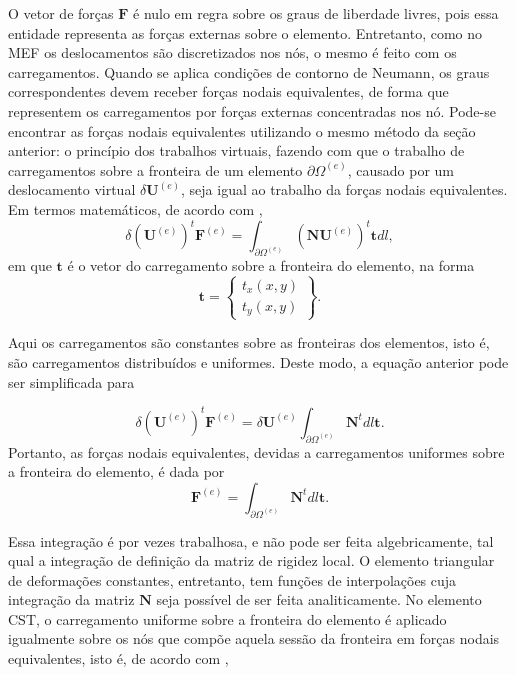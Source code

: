O vetor de forças $\bm{F}$ é nulo em regra sobre os graus de liberdade livres, pois essa entidade representa as forças externas sobre o elemento. Entretanto, como no MEF os deslocamentos são discretizados nos nós, o mesmo é feito com os carregamentos. Quando se aplica condições de contorno de Neumann, os graus correspondentes devem receber forças nodais equivalentes, de forma que representem os carregamentos por forças externas concentradas nos nó. Pode-se encontrar as forças nodais equivalentes utilizando o mesmo método da seção anterior: o princípio dos trabalhos virtuais, fazendo com que o trabalho de carregamentos sobre a fronteira de um elemento $\partial \Omega^{(e)}$, causado por um deslocamento virtual $\delta \bm{U}^{(e)}$, seja igual ao trabalho da forças nodais equivalentes. Em termos matemáticos, de acordo com ,
\begin{equation}
    \delta (\bm{U}^{(e)})^t \bm{F}^{(e)} = \int_{\partial \Omega^{(e)}} (\bm{N}\bm{U}^{(e)})^t \bm{t} dl,
\end{equation}
em que $\bm{t}$ é o vetor do carregamento sobre a fronteira do elemento, na forma
\begin{equation}
    \bm{t} = \begin{Bmatrix}
        t_x(x,y) \\ t_y(x,y)
    \end{Bmatrix}.
\end{equation}

Aqui os carregamentos são constantes sobre as fronteiras dos elementos, isto é, são carregamentos distribuídos e uniformes. Deste modo, a equação anterior pode ser simplificada para

\begin{equation}
    \delta (\bm{U}^{(e)})^t \bm{F}^{(e)} = \delta \bm{U}^{(e)} \int_{\partial \Omega^{(e)}} \bm{N}^t dl \bm{t}. 
\end{equation}
Portanto, as forças nodais equivalentes, devidas a carregamentos uniformes sobre a fronteira do elemento, é dada por
\begin{equation}
    \bm{F}^{(e)} = \int_{\partial \Omega^{(e)}} \bm{N}^t dl \bm{t}.
\end{equation}

Essa integração é por vezes trabalhosa, e não pode ser feita algebricamente, tal qual a integração de definição da matriz de rigidez local. O elemento triangular de deformações constantes, entretanto, tem funções de interpolações cuja integração da matriz $\bm{N}$ seja possível de ser feita analiticamente. No elemento CST, o carregamento uniforme sobre a fronteira do elemento é aplicado igualmente sobre os nós que compõe aquela sessão da fronteira em forças nodais equivalentes, isto é, de acordo com \cite{Onate},

